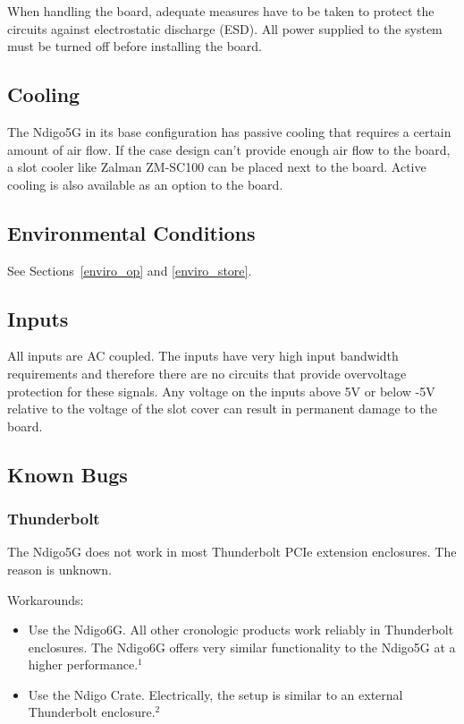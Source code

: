     When handling the board, adequate measures have to be taken to protect the circuits against electrostatic discharge (ESD). All power supplied to the system must be turned off before installing the board.

\subsection{Cooling}

    The Ndigo5G in its base configuration has passive cooling that requires a certain amount of air flow. If the case design can't provide enough air flow to the board, a slot cooler like Zalman ZM-SC100 can be placed next to the board. Active cooling is also available as an option to the board.

\subsection{Environmental Conditions}
    See Sections~\ref{enviro_op} and \ref{enviro_store}.

\subsection{Inputs}

    All inputs are AC coupled. The inputs have very high input bandwidth requirements and therefore there are no circuits that provide overvoltage protection for these signals. Any voltage on the inputs above 5V or below -5V relative to the voltage of the slot cover can result in permanent damage to the board.

\subsection{Known Bugs}

\subsubsection{Thunderbolt}
The Ndigo5G does not work in most Thunderbolt PCIe extension enclosures. The reason is unknown.\par
Workarounds:
\begin{itemize}
    \item Use the Ndigo6G. All other cronologic products work reliably in Thunderbolt enclosures. The Ndigo6G offers very similar functionality to the Ndigo5G at a higher performance.$^1$
    \item Use the Ndigo Crate. Electrically, the setup is similar to an external Thunderbolt enclosure.$^2$ 
\end{itemize}


